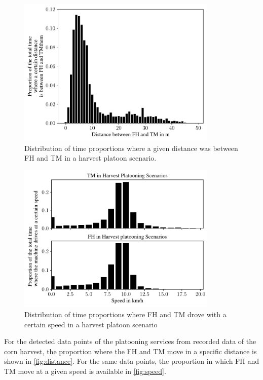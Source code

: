 \begin{figure}%
   \centering
   \includegraphics[width=0.85\textwidth]{figures/distanceHarvestScenario}
   \caption{Distribution of time proportions where a given distance was between \acf{FH} and \acf{TM} in a harvest platoon scenario.}%
   \label{fig:distance}%
\end{figure}
\begin{figure}%
   \centering
   \includegraphics[width=0.85\textwidth]{figures/speedHarvestScenario}
   \caption{Distribution of time proportions where \acf{FH} and \acf{TM} drove with a certain speed in a harvest platoon scenario}%
   \label{fig:speed}%
\end{figure}
For the detected data points of the platooning services from recorded data of the corn harvest,
the proportion where the \ac{FH} and \ac{TM} move in a specific distance is shown in \autoref{fig:distance}.
For the same data points, the proportion in which \ac{FH} and \ac{TM} move at a given speed is available in \autoref{fig:speed}.

